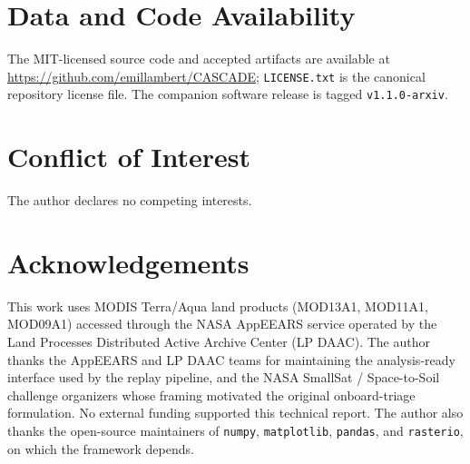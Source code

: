 \documentclass[11pt]{article}
\begin{document}
\section*{Data and Code Availability}

The MIT-licensed source code and accepted artifacts are available at \url{https://github.com/emillambert/CASCADE}; \texttt{LICENSE.txt} is the canonical repository license file. The companion software release is tagged \texttt{v1.1.0-arxiv}.

\section*{Conflict of Interest}

The author declares no competing interests.

\section*{Acknowledgements}

This work uses MODIS Terra/Aqua land products (MOD13A1, MOD11A1, MOD09A1) accessed through the NASA AppEEARS service operated by the Land Processes Distributed Active Archive Center (LP DAAC). The author thanks the AppEEARS and LP DAAC teams for maintaining the analysis-ready interface used by the replay pipeline, and the NASA SmallSat / Space-to-Soil challenge organizers whose framing motivated the original onboard-triage formulation. No external funding supported this technical report. The author also thanks the open-source maintainers of \texttt{numpy}, \texttt{matplotlib}, \texttt{pandas}, and \texttt{rasterio}, on which the framework depends.

\newpage


\end{document}
